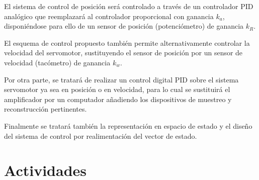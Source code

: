 El sistema de control de posición será controlado a través de un
controlador PID analógico que reemplazará al controlador proporcional
con ganancia $k_a$, disponiéndose para ello de un sensor de posición
(potenciómetro) de ganancia $k_R$.

El esquema de control propuesto también permite alternativamente
controlar la velocidad del servomotor, sustituyendo el sensor de
posición por un sensor de velocidad (tacómetro) de ganancia $k_w$.

Por otra parte, se tratará de realizar un control digital PID sobre el
sistema servomotor ya sea en posición o en velocidad, para lo cual se
sustituirá el amplificador por un computador añadiendo los
dispositivos de muestreo y reconstrucción pertinentes.

Finalmente se tratará también la representación en espacio de estado y
el diseño del sistema de control por realimentación del vector de
estado.

\section{Actividades}

















